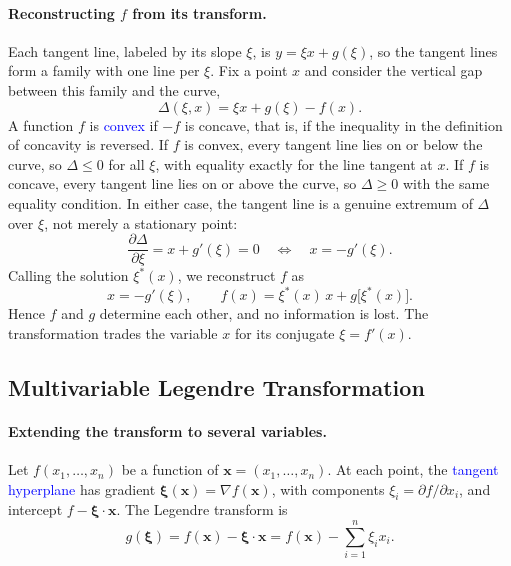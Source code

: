 \paragraph{Reconstructing $f$ from its transform.}
Each tangent line, labeled by its slope $\xi$, is $y=\xi x+g(\xi)$, so the
tangent lines form a family with one line per $\xi$. Fix a point $x$ and
consider the vertical gap between this family and the curve,
\begin{equation*}
    \Delta(\xi,x)=\xi x+g(\xi)-f(x).
\end{equation*}
A function $f$ is \textcolor{blue}{convex} if $-f$ is concave, that is, if
the inequality in the definition of concavity is reversed. If $f$ is convex,
every tangent line lies on or below the curve, so $\Delta\leq0$ for all
$\xi$, with equality exactly for the line tangent at $x$. If $f$ is concave,
every tangent line lies on or above the curve, so $\Delta\geq0$ with the same
equality condition. In either case, the tangent line is a genuine extremum of
$\Delta$ over $\xi$, not merely a stationary point:
\begin{equation*}
    \frac{\partial\Delta}{\partial\xi}=x+g'(\xi)=0
    \quad\Longleftrightarrow\quad x=-g'(\xi).
\end{equation*}
Calling the solution $\xi^*(x)$, we reconstruct $f$ as
\begin{equation}
    \boxed{x=-g'(\xi),\qquad f(x)=\xi^*(x)\,x+g\big[\xi^*(x)\big].}
\end{equation}
Hence $f$ and $g$ determine each other, and no information is lost. The
transformation trades the variable $x$ for its conjugate $\xi=f'(x)$.

\subsection{Multivariable Legendre Transformation}

\paragraph{Extending the transform to several variables.}
Let $f(x_1,\ldots,x_n)$ be a function of $\mathbf{x}=(x_1,\ldots,x_n)$. At
each point, the \textcolor{blue}{tangent hyperplane} has gradient
$\boldsymbol{\xi}(\mathbf{x})=\nabla f(\mathbf{x})$, with components
$\xi_i=\partial f/\partial x_i$, and intercept $f-\boldsymbol{\xi}\cdot\mathbf{x}$.
The Legendre transform is
\begin{equation}
    \boxed{g(\boldsymbol{\xi})
    = f(\mathbf{x})-\boldsymbol{\xi}\cdot\mathbf{x}
    = f(\mathbf{x})-\sum_{i=1}^n\xi_i x_i.}
\end{equation}

